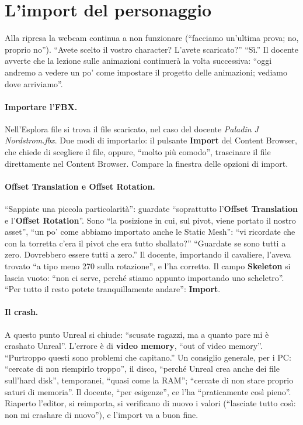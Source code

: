 \section{L'import del personaggio}
\label{ue8:sec:import}

Alla ripresa la webcam continua a non funzionare (``facciamo un'ultima prova; no,
proprio no''). ``Avete scelto il vostro character? L'avete scaricato?'' ``Sì.'' Il
docente avverte che la lezione sulle animazioni continuerà la volta successiva: ``oggi
andremo a vedere un po' come impostare il progetto delle animazioni; vediamo dove
arriviamo''.

\paragraph{Importare l'FBX.} Nell'Esplora file si trova il file scaricato, nel caso del
docente \emph{Paladin J Nordstrom.fbx}. Due modi di importarlo: il pulsante
\textbf{Import} del Content Browser, che chiede di scegliere il file, oppure, ``molto più
comodo'', trascinare il file direttamente nel Content Browser. Compare la finestra delle
opzioni di import.

\paragraph{Offset Translation e Offset Rotation.} ``Sappiate una piccola particolarità'':
guardate ``soprattutto l'\textbf{Offset Translation} e l'\textbf{Offset Rotation}''. Sono
``la posizione in cui, sul pivot, viene portato il nostro asset'', ``un po' come
abbiamo importato anche le Static Mesh'': ``vi ricordate che con la torretta c'era il
pivot che era tutto sballato?'' ``Guardate se sono tutti a zero. Dovrebbero essere tutti
a zero.'' Il docente, importando il cavaliere, l'aveva trovato ``a tipo meno 270 sulla
rotazione'', e l'ha corretto. Il campo \textbf{Skeleton} si lascia vuoto: ``non ci serve,
perché stiamo appunto importando uno scheletro''. ``Per tutto il resto potete
tranquillamente andare'': \textbf{Import}.

\paragraph{Il crash.} A questo punto Unreal si chiude: ``scusate ragazzi, ma a quanto
pare mi è crashato Unreal''. L'errore è di \textbf{video memory}, ``out of video
memory''. ``Purtroppo questi sono problemi che capitano.'' Un consiglio generale, per i
PC: ``cercate di non riempirlo troppo'', il disco, ``perché Unreal crea anche dei file
sull'hard disk'', temporanei, ``quasi come la RAM''; ``cercate di non stare proprio
saturi di memoria''. Il docente, ``per esigenze'', ce l'ha ``praticamente così pieno''.
Riaperto l'editor, si reimporta, si verificano di nuovo i valori (``lasciate tutto così:
non mi crashare di nuovo''), e l'import va a buon fine.

